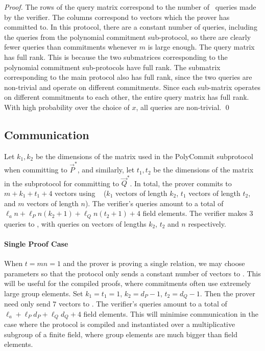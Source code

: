 \begin{proof}
The rows of the query matrix correspond to the number of \ILC\ queries made by the verifier. The columns correspond to vectors which the prover has committed to. In this protocol, there are a constant number of queries, including the queries from the polynomial commitment sub-protocol, so there are clearly fewer queries than commitments whenever $m$ is large enough. The query matrix has full rank. This is because the two submatrices corresponding to the polynomial commitment sub-protocols have full rank. The submatrix corresponding to the main protocol also has full rank, since the two queries are non-trivial and operate on different commitments. Since each sub-matrix operates on different commitments to each other, the entire query matrix has full rank. With high probability over the choice of $x$, all queries are non-trivial. \qed
\end{proof}

\subsection{Communication} Let $k_1,k_2$ be the dimensions of the matrix used in the PolyCommit subprotocol when committing to $\vec{P}^*$, and similarly, let $t_1,t_2$ be the dimensions of the matrix in the subprotocol for committing to $\vec{Q}^*$. In total, the prover commits to $m+k_1+t_1+4$ vectors using \ILC~ ($k_1$ vectors of length $k_2$, $t_1$ vectors of length $t_2$, and $m$ vectors of length $n$). The verifier's queries amount to a total of $\ell_a n + \ell_P n (k_2+1) + \ell_Q n (t_2+1) + 4$ field elements. The verifier makes $3$ queries to \ILC, with queries on vectors of lengths $k_2$, $t_2$ and $n$ respectively.

\paragraph{Single Proof Case} When $t=mn=1$ and the prover is proving a single relation, we may choose parameters so that the protocol only sends a constant number of vectors to \ILC. This will be useful for the compiled proofs, where commitments often use extremely large group elements. Set $k_1 = t_1 = 1$, $k_2 = d_P-1$, $t_2 = d_Q-1$. Then the prover need only send $7$ vectors to \ILC. The verifier's queries amount to a total of $\ell_a + \ell_P d_P + \ell_Q d_Q + 4$ field elements. This will minimise communication in the case where the protocol is compiled and instantiated over a multiplicative subgroup of a finite field, where group elements are much bigger than field elements.

